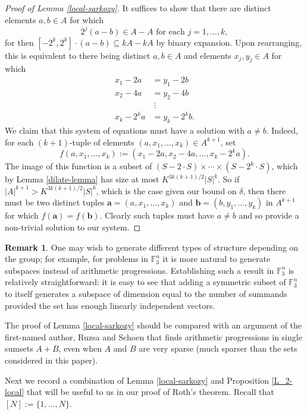 \documentclass[12pt,a4paper,reqno]{amsart}
\numberwithin{equation}{section}
\theoremstyle{plain}
\theoremstyle{definition}
\newtheorem{remark}[theorem]{Remark}
\renewcommand{\subset}{\subseteq}
\def\F{\mathbb{F}}
\begin{document}
\begin{proof}[Proof of Lemma \ref{local-sarkozy}]
It suffices to show that there are distinct elements $a,b \in A$ for which
\[ 2^j(a-b) \in A-A \text{ for each $j = 1,\ldots,k$}, \]
for then $[-2^k, 2^k]\cdot (a-b) \subset kA - kA$ by binary expansion. Upon rearranging, this is equivalent to there being distinct $a,b \in A$ and elements $x_j, y_j \in A$ for which
\begin{align*}
x_1 - 2a &= y_1 - 2b \\
x_2 - 4a &= y_2 - 4b \\
&\ \vdots \\
x_k - 2^k a  &= y_k - 2^k b.
\end{align*}
We claim that this system of equations must have a solution with $a \neq b$. Indeed, for each $(k+1)$-tuple of elements $(a,x_1,\ldots,x_k) \in A^{k+1}$, set
\[ f(a,x_1,\ldots,x_k) := (x_1-2a, x_2-4a, \ldots, x_k-2^k a). \]
The image of this function is a subset of $(S-2\cdot S)\times \cdots \times (S-2^k \cdot S)$, which by Lemma \ref{dilate-lemma} has size at most $K^{3k(k+1)/2} |S|^k$. So if $|A|^{k+1} > K^{3k(k+1)/2} |S|^k$, which is the case given our bound on $\delta$, then there must be two distinct tuples $\mathbf{a} = (a,x_1,\ldots,x_k)$ and $\mathbf{b} = (b,y_1,\ldots,y_k)$ in $A^{k+1}$ for which $f(\mathbf{a}) = f(\mathbf{b})$. Clearly such tuples must have $a \neq b$ and so provide a non-trivial solution to our system.
\end{proof}

\begin{remark}
One may wish to generate different types of structure depending on the group; for example, for problems in $\F_3^n$ it is more natural to generate subspaces instead of arithmetic progressions. Establishing such a result in $\F_3^n$ is relatively straightforward: it is easy to see that adding a symmetric subset of $\F_3^n$ to itself generates a subspace of dimension equal to the number of summands provided the set has enough linearly independent vectors.
\end{remark}

The proof of Lemma \ref{local-sarkozy} should be compared with an argument of the first-named author, Ruzsa and Schoen \cite{croot-ruzsa-schoen} that finds arithmetic progressions in single sumsets $A+B$, even when $A$ and $B$ are very sparse (much sparser than the sets considered in this paper).

Next we record a combination of Lemma \ref{local-sarkozy} and Proposition \ref{L_2-local} that will be useful to us in our proof of Roth's theorem. Recall that $[N] := \{1, \ldots, N\}$.
\end{document}
